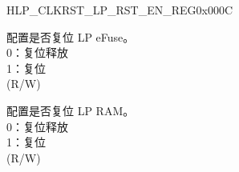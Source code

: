 \addtocounter{Regfloat}{-1}
\begin{register}{H}{LP\_CLKRST\_LP\_RST\_EN\_REG}{0x000C}
\begin{regdesc}\begin{reglist}
\item [接上页...]
\label{fielddesc:LPCLKRSTRSTENLPAONEFUSEREG}\item [LP\_CLKRST\_RST\_EN\_LP\_AONEFUSEREG] 配置是否复位 LP eFuse。\\
0：复位释放\\
1：复位\\ (R/W)
\label{fielddesc:LPCLKRSTRSTENLPRAM}\item [LP\_CLKRST\_RST\_EN\_LP\_RAM] 配置是否复位 LP RAM。\\
0：复位释放\\
1：复位\\ (R/W)
\end{reglist}\end{regdesc}
\end{register}


